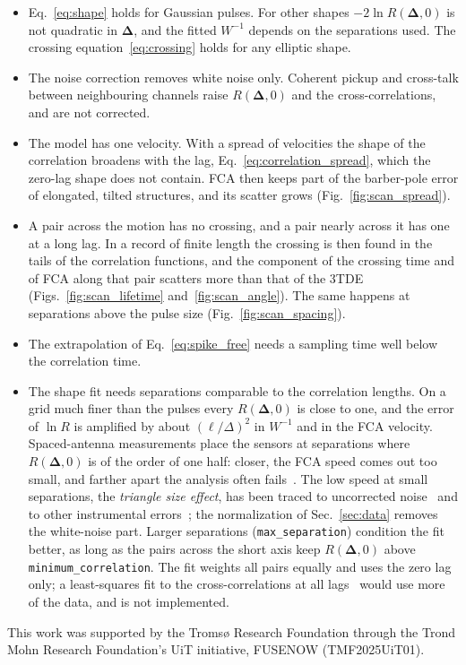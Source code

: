 \documentclass[aps,pre,11pt,a4paper,preprint,amsmath,amssymb,groupedaddress]{revtex4-2}
\newcommand{\Eqref}[1]{Eq.~\eqref{#1}}
\newcommand{\Figref}[1]{Fig.~\ref{#1}}
\newcommand{\Figsref}[2]{Figs.~\ref{#1} and~\ref{#2}}
\newcommand{\Secref}[1]{Sec.~\ref{#1}}
\newcommand{\bD}{\ensuremath{\bm{\Delta}}}
\newcommand{\Wi}{\ensuremath{W^{-1}}}
\newcommand{\code}[1]{\texttt{#1}}
\begin{document}
\begin{itemize}
\item \Eqref{eq:shape} holds for Gaussian pulses. For other shapes $-2\ln R(\bD,0)$ is not quadratic in \bD, and the fitted \Wi{} depends on the separations used. The crossing equation~\eqref{eq:crossing} holds for any elliptic shape.
\item The noise correction removes white noise only. Coherent pickup and cross-talk between neighbouring channels raise $R(\bD,0)$ and the cross-correlations, and are not corrected.
\item The model has one velocity. With a spread of velocities the shape of the correlation broadens with the lag, \Eqref{eq:correlation_spread}, which the zero-lag shape does not contain. FCA then keeps part of the barber-pole error of elongated, tilted structures, and its scatter grows (\Figref{fig:scan_spread}).
\item A pair across the motion has no crossing, and a pair nearly across it has one at a long lag. In a record of finite length the crossing is then found in the tails of the correlation functions, and the component of the crossing time and of FCA along that pair scatters more than that of the 3TDE (\Figsref{fig:scan_lifetime}{fig:scan_angle}). The same happens at separations above the pulse size (\Figref{fig:scan_spacing}).
\item The extrapolation of \Eqref{eq:spike_free} needs a sampling time well below the correlation time.
\item The shape fit needs separations comparable to the correlation lengths. On a grid much finer than the pulses every $R(\bD,0)$ is close to one, and the error of $\ln R$ is amplified by about $(\ell/\Delta)^2$ in \Wi{} and in the FCA velocity. Spaced-antenna measurements place the sensors at separations where $R(\bD,0)$ is of the order of one half: closer, the FCA speed comes out too small, and farther apart the analysis often fails~\cite{briggs_analysis_1984}. The low speed at small separations, the \emph{triangle size effect}, has been traced to uncorrected noise~\cite{meek_triangle_1990,holdsworth_simple_1995} and to other instrumental errors~\cite{holdsworth_influence_1999}; the normalization of \Secref{sec:data} removes the white-noise part. Larger separations (\code{max\_separation}) condition the fit better, as long as the pairs across the short axis keep $R(\bD,0)$ above \code{minimum\_correlation}. The fit weights all pairs equally and uses the zero lag only; a least-squares fit to the cross-correlations at all lags~\cite{fedor_statistical_1967,baker_estimation_1981} would use more of the data, and is not implemented.
\end{itemize}

\begin{acknowledgments}
This work was supported by the Tromsø Research Foundation through the Trond Mohn Research Foundation's UiT initiative, FUSENOW (TMF2025UiT01).
\end{acknowledgments}


\end{document}
